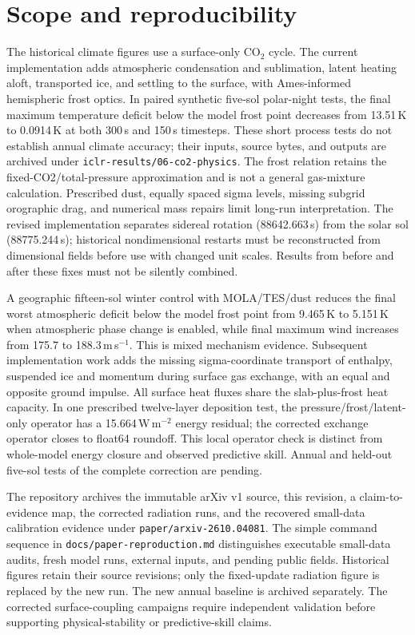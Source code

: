 \documentclass{article} %
\newcommand{\co}{CO$_2$}
\begin{document}
\section*{Scope and reproducibility}
The historical climate figures use a surface-only \co{} cycle. The current implementation adds atmospheric condensation and sublimation, latent heating aloft, transported ice, and settling to the surface, with Ames-informed hemispheric frost optics. In paired synthetic five-sol polar-night tests, the final maximum temperature deficit below the model frost point decreases from 13.51\,K to 0.0914\,K at both 300\,s and 150\,s timesteps. These short process tests do not establish annual climate accuracy; their inputs, source bytes, and outputs are archived under \texttt{iclr-results/06-co2-physics}. The frost relation retains the fixed-CO2/total-pressure approximation and is not a general gas-mixture calculation. Prescribed dust, equally spaced sigma levels, missing subgrid orographic drag, and numerical mass repairs limit long-run interpretation. The revised implementation separates sidereal rotation (88642.663\,s) from the solar sol (88775.244\,s); historical nondimensional restarts must be reconstructed from dimensional fields before use with changed unit scales. Results from before and after these fixes must not be silently combined.

A geographic fifteen-sol winter control with MOLA/TES/dust reduces the final worst atmospheric deficit below the model frost point from 9.465\,K to 5.151\,K when atmospheric phase change is enabled, while final maximum wind increases from 175.7 to 188.3\,m\,s$^{-1}$. This is mixed mechanism evidence. Subsequent implementation work adds the missing sigma-coordinate transport of enthalpy, suspended ice and momentum during surface gas exchange, with an equal and opposite ground impulse. All surface heat fluxes share the slab-plus-frost heat capacity. In one prescribed twelve-layer deposition test, the pressure/frost/latent-only operator has a 15.664\,W\,m$^{-2}$ energy residual; the corrected exchange operator closes to float64 roundoff. This local operator check is distinct from whole-model energy closure and observed predictive skill. Annual and held-out five-sol tests of the complete correction are pending.

The repository archives the immutable arXiv v1 source, this revision, a claim-to-evidence map, the corrected radiation runs, and the recovered small-data calibration evidence under \texttt{paper/arxiv-2610.04081}. The simple command sequence in \texttt{docs/paper-reproduction.md} distinguishes executable small-data audits, fresh model runs, external inputs, and pending public fields. Historical figures retain their source revisions; only the fixed-update radiation figure is replaced by the new run. The new annual baseline is archived separately. The corrected surface-coupling campaigns require independent validation before supporting physical-stability or predictive-skill claims.
\end{document}
